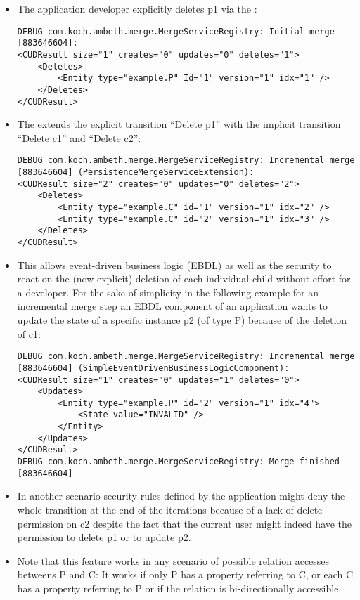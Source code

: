 \begin{enumerate}
\begin{itemize}
			\item The application developer explicitly deletes p1 via the \AMBETH{} :
\begin{lstlisting}[style=POM]
DEBUG com.koch.ambeth.merge.MergeServiceRegistry: Initial merge [883646604]:
<CUDResult size="1" creates="0" updates="0" deletes="1">
	<Deletes>
		<Entity type="example.P" Id="1" version="1" idx="1" />
	</Deletes>
</CUDResult>
\end{lstlisting}
			\item The  extends the explicit transition ``Delete p1'' with the implicit transition ``Delete c1'' and ``Delete c2'':
\begin{lstlisting}[style=POM]		
DEBUG com.koch.ambeth.merge.MergeServiceRegistry: Incremental merge [883646604] (PersistenceMergeServiceExtension):
<CUDResult size="2" creates="0" updates="0" deletes="2">
	<Deletes>
		<Entity type="example.C" id="1" version="1" idx="2" />
		<Entity type="example.C" id="2" version="1" idx="3" />
	</Deletes>
</CUDResult>
\end{lstlisting}			
			\item This allows event-driven business logic (EBDL) as well as the \AMBETH{} security to react on the (now explicit) deletion of each individual child without  effort for a developer. For the sake of simplicity in the following example for an incremental merge step an EBDL component of an application wants to update the state of a specific instance p2 (of type P) because of the deletion of c1:
\begin{lstlisting}[style=POM]		
DEBUG com.koch.ambeth.merge.MergeServiceRegistry: Incremental merge [883646604] (SimpleEventDrivenBusinessLogicComponent):
<CUDResult size="1" creates="0" updates="1" deletes="0">
	<Updates>
		<Entity type="example.P" id="2" version="1" idx="4">
			<State value="INVALID" />
		</Entity>
	</Updates>
</CUDResult>
DEBUG com.koch.ambeth.merge.MergeServiceRegistry: Merge finished [883646604]
\end{lstlisting}
			\item In another scenario security rules defined by the application might deny the whole transition at the end of the  iterations because of a lack of delete permission on c2 despite the fact that the current user might indeed have the permission to delete p1 or to update p2.
			\item Note that this feature works in any scenario of possible relation accesses betweens P and C: It works if only P has a property referring to C, or each C has a property referring to P or if the relation is bi-directionally accessible.

\end{itemize}
\end{enumerate}
